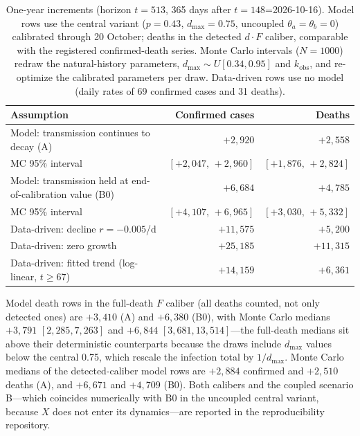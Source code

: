 \documentclass[preprint,12pt,numbers]{elsarticle}
\begin{document}
\begin{table}[htbp]
\centering
\caption{One-year increments (horizon $t=513$, 365 days after
$t=148$=2026-10-16). Model rows use the central variant ($p=0.43$,
$d_{\max}=0.75$, uncoupled $\theta_a=\theta_b=0$) calibrated through
20 October; deaths in the detected
$d\cdot F$ caliber, comparable with the registered confirmed-death
series. Monte Carlo intervals ($N=1000$) redraw the natural-history
parameters, $d_{\max}\sim U[0.34,0.95]$ and $k_{\mathrm{obs}}$, and
re-optimize the calibrated parameters per draw. Data-driven rows use no
model (daily rates of 69 confirmed cases and 31 deaths).}
\label{tab:proj}
\begin{tabularx}{\textwidth}{Xrr}
\toprule
Assumption & Confirmed cases & Deaths \\
\midrule
Model: transmission continues to decay (A) & $+2{,}920$ & $+2{,}558$ \\
\quad MC 95\% interval & $[+2{,}047,\,+2{,}960]$ & $[+1{,}876,\,+2{,}824]$ \\
Model: transmission held at end-of-calibration value (B0) & $+6{,}684$ & $+4{,}785$ \\
\quad MC 95\% interval & $[+4{,}107,\,+6{,}965]$ & $[+3{,}030,\,+5{,}332]$ \\
Data-driven: decline $r=-0.005$/d & $+11{,}575$ & $+5{,}200$ \\
Data-driven: zero growth & $+25{,}185$ & $+11{,}315$ \\
Data-driven: fitted trend (log-linear, $t\ge67$) & $+14{,}159$ & $+6{,}361$ \\
\bottomrule
\end{tabularx}
\vspace{2pt}
\par\small Model death rows in the full-death $F$ caliber (all deaths
counted, not only detected ones) are $+3{,}410$ (A) and $+6{,}380$
(B0), with Monte Carlo medians $+3{,}791$ $[2{,}285,7{,}263]$ and
$+6{,}844$ $[3{,}681,13{,}514]$---the full-death medians sit above
their deterministic counterparts because the draws include $d_{\max}$
values below the central 0.75, which rescale the infection total by
$1/d_{\max}$. Monte Carlo medians of the detected-caliber model rows
are $+2{,}884$ confirmed and $+2{,}510$ deaths (A), and $+6{,}671$ and
$+4{,}709$ (B0). Both calibers and the coupled scenario B---which
coincides numerically with B0 in the uncoupled central variant, because
$X$ does not enter its dynamics---are reported in the reproducibility
repository.
\end{table}
\end{document}
